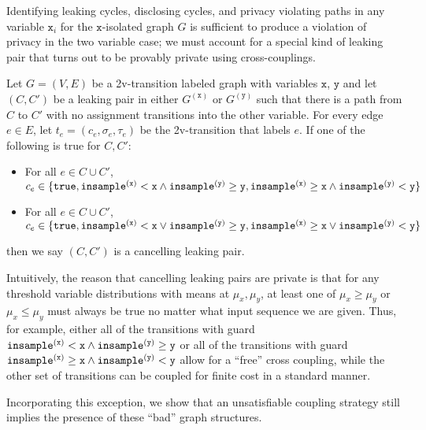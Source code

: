 Identifying leaking cycles, disclosing cycles, and privacy violating paths in any variable $\texttt{x}_i$ for the $\texttt{x}$-isolated graph $G$ is sufficient to produce a violation of privacy in the two variable case; we must account for a special kind of leaking pair that turns out to be provably private using cross-couplings. 

\begin{defn}
    Let $G = (V, E)$ be a 2v-transition labeled graph with variables $\texttt{x}$, $\texttt{y}$ and let $(C, C')$ be a leaking pair in either $G^{(\texttt{x})}$ or $G^{(\texttt{y})}$ such that there is a path from $C$ to $C'$ with no assignment transitions into the other variable. For every edge $e\in E$, let $t_e = (c_e, \sigma_e, \tau_e)$ be the 2v-transition that labels $e$. 
    If one of the following is true for $C, C'$: \begin{itemize}
        \item For all $e\in C\cup C'$, $c_e \in \{\texttt{true}, \mvlguard[\texttt{x}]\land\mvgguard[\texttt{y}], \mvgguard[\texttt{x}]\land\mvlguard[\texttt{y}]\}$
        \item For all $e\in C\cup C'$, $c_e \in \{\texttt{true}, \mvlguard[\texttt{x}]\lor\mvgguard[\texttt{y}], \mvgguard[\texttt{x}]\lor\mvlguard[\texttt{y}]\}$
\end{itemize}
then we say $(C, C')$ is a cancelling leaking pair. 
\end{defn}

Intuitively, the reason that cancelling leaking pairs are private is that for any threshold variable distributions with means at $\mu_x,\mu_y$, at least one of $\mu_x\geq\mu_y$ or $\mu_x\leq \mu_y$ must always be true no matter what input sequence we are given. 
Thus, for example, either all of the transitions with guard $\mvlguard[\texttt{x}]\land\mvgguard[\texttt{y}]$ or all of the transitions with guard $\mvgguard[\texttt{x}]\land\mvlguard[\texttt{y}]$ allow for a ``free'' cross coupling, while the other set of transitions can be coupled for finite cost in a standard manner.

Incorporating this exception, we show that an unsatisfiable coupling strategy still implies the presence of these ``bad'' graph structures. 

